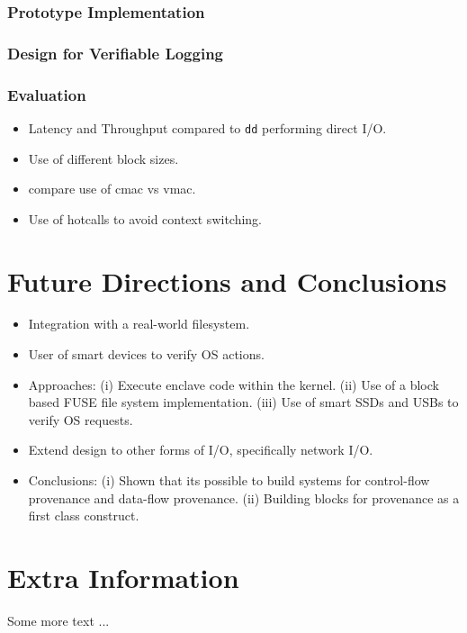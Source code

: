 \documentclass[withindex,glossary]{cam-thesis}
\begin{document}
\subsection{Prototype Implementation}

\subsection{Design for Verifiable Logging}



\subsection{Evaluation}
\begin{itemize}
\item Latency and Throughput compared to \texttt{dd} performing direct I/O.
\item Use of different block sizes.
\item compare use of cmac vs vmac.
\item Use of hotcalls to avoid context switching.
\end{itemize}

\chapter{Future Directions and Conclusions}
\begin{itemize}
\item Integration with a real-world filesystem.
\item User of smart devices to verify OS actions.
\item Approaches:
(i) Execute enclave code within the kernel.
(ii) Use of a block based FUSE file system implementation.
(iii) Use of smart SSDs and USBs to verify OS requests.
\item Extend design to other forms of I/O, specifically network I/O.

\item Conclusions: 
(i) Shown that its possible to build systems for control-flow provenance and data-flow provenance.
(ii) Building blocks for provenance as a first class construct.
\end{itemize}




\cleardoublepage
{}
{}






\appendix

\chapter{Extra Information}
Some more text ...



\printthesisindex
\end{document}
